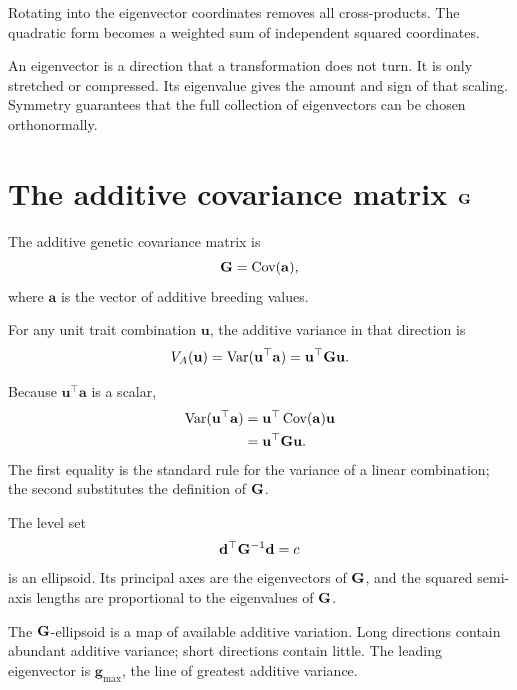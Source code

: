 \inwords Rotating into the eigenvector coordinates removes all cross-products. The quadratic form becomes a weighted sum of independent squared coordinates.

\begin{mathteach}
An eigenvector is a direction that a transformation does not turn. It is only stretched or compressed. Its eigenvalue gives the amount and sign of that scaling. Symmetry guarantees that the full collection of eigenvectors can be chosen orthonormally.
\end{mathteach}

\section{The additive covariance matrix \(\mathbf{G}\)}

The additive genetic covariance matrix is
\begin{equation}
\mathbf{G}=\operatorname{Cov}(\mathbf a),
\end{equation}
where \(\mathbf a\) is the vector of additive breeding values.

For any unit trait combination \(\mathbf u\), the additive variance in that direction is
\begin{equation}
V_A(\mathbf u)=\operatorname{Var}(\mathbf u^\top\mathbf a)
=\mathbf u^\top\mathbf{G}\mathbf u.
\label{eq:directionalVariance}
\end{equation}

\begin{derivationbox}
Because \(\mathbf u^\top\mathbf a\) is a scalar,
\begin{align}
\operatorname{Var}(\mathbf u^\top\mathbf a)
&=\mathbf u^\top\operatorname{Cov}(\mathbf a)\mathbf u\\
&=\mathbf u^\top\mathbf{G}\mathbf u.
\end{align}
The first equality is the standard rule for the variance of a linear combination; the second substitutes the definition of \(\mathbf{G}\).
\end{derivationbox}

The level set
\begin{equation}
\mathbf d^\top\mathbf{G}^{-1}\mathbf d=c
\end{equation}
is an ellipsoid. Its principal axes are the eigenvectors of \(\mathbf{G}\), and the squared semi-axis lengths are proportional to the eigenvalues of \(\mathbf{G}\).

\begin{geombox}
The \(\mathbf{G}\)-ellipsoid is a map of available additive variation. Long directions contain abundant additive variance; short directions contain little. The leading eigenvector is \(\mathbf g_{\max}\), the line of greatest additive variance.
\end{geombox}

